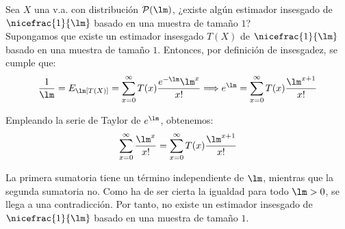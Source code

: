 \begin{ejemplo}
    Sea $X$ una v.a. con distribución $\cc{P}(\lm)$, ¿existe algún estimador insesgado de $\nicefrac{1}{\lm}$ basado en una muestra de tamaño $1$?\\

    Supongamos que existe un estimador insesgado $T(X)$ de $\nicefrac{1}{\lm}$ basado en una muestra de tamaño $1$. Entonces, por definición de insesgadez, se cumple que:
    \begin{equation*}
        \dfrac{1}{\lm} = E_\lm[T(X)] = \sum_{x=0}^{\infty} T(x) \dfrac{e^{-\lm}\lm^x}{x!}
        \Longrightarrow
        e^{\lm} = \sum_{x=0}^{\infty} T(x) \dfrac{\lm^{x+1}}{x!}
    \end{equation*}

    Empleando la serie de Taylor de $e^{\lm}$, obtenemos:
    \begin{equation*}
        \sum_{x=0}^{\infty} \dfrac{\lm^x}{x!} = \sum_{x=0}^{\infty} T(x) \dfrac{\lm^{x+1}}{x!}
    \end{equation*}

    La primera sumatoria tiene un término independiente de $\lm$, mientras que la segunda sumatoria no. Como ha de ser cierta la igualdad para todo $\lm > 0$, se llega a una contradicción. Por tanto, no existe un estimador insesgado de $\nicefrac{1}{\lm}$ basado en una muestra de tamaño $1$.
\end{ejemplo}

